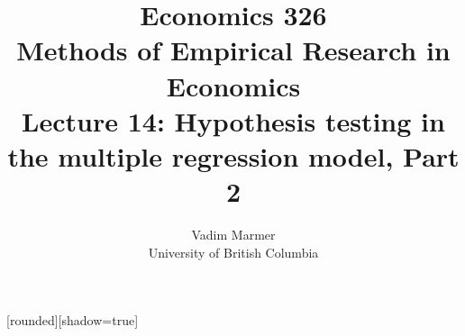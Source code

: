 \documentclass[notes=show,compress,beamer]{beamer}
\begin{document}
\title{
Economics 326 \\
Methods of Empirical Research in Economics\\
\bigskip
Lecture 14: Hypothesis testing in the multiple regression model, Part 2
}%

\author{Vadim Marmer\\
University of British Columbia
}%

%
%
%
%
[rounded][shadow=true]

%

\addtocounter{framenumber}{-1}%
\end{document}
